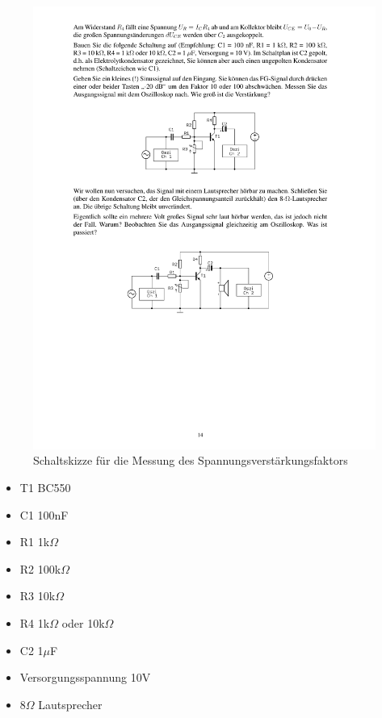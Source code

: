 \documentclass[12pt,a4paper]{article}
\begin{document}
\begin{figure}[H] 
  \centering
    \includegraphics[trim = 10mm 165mm 10mm 60mm, clip, scale = 1]{ep3_14[Page14].pdf}
  	\caption[Schaltskizze für die Messung des Spannungsverstärkungsfaktors]{Schaltskizze für die Messung des Spannungsverstärkungsfaktors\footnotemark}
  \label{fig:2}
\end{figure}


\begin{itemize}
\item	T1 BC550

\item	C1 100nF

\item	R1 1k$\Omega$

\item	R2 100k$\Omega$

\item	R3 10k$\Omega$

\item	R4 1k$\Omega$ oder 10k$\Omega$

\item	C2 1$\mu$F

\item	Versorgungsspannung 10V

\item	8$\Omega$ Lautsprecher
\end{itemize}
\end{document}
